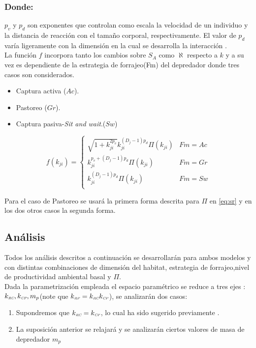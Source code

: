 \subsubsection*{Donde:}
$p_v$ y $p_d$ son exponentes que controlan como escala la velocidad de un individuo  y la distancia de reacci\'on con el tama\~no corporal, respectivamente. El valor de $p_d$ var\'ia ligeramente con la dimensi\'on en la cual se desarrolla la interacci\'on \citep{pawar2012dimensionality}.\\
La funci\'on $f$ incorpora tanto los cambios sobre $S_A$ como $\aleph$ respecto a $k$ y a su vez es dependiente de la estrategia de forrajeo(Fm) del depredador donde tres casos son considerados\citep{pawar2012dimensionality}.
\begin{itemize}
\item Captura activa ($Ac$).
\item Pastoreo ($Gr$).
\item Captura pasiva-\textit{Sit and wait}.($Sw$) 
\end{itemize}

\begin{equation}\label{eq:fkr}
f(k_{ji}) = 
\begin{cases}
\sqrt{1+k_{ji}^{2p_v}}k_{ji}^{(D_j-1)p_d} \Pi(k_{ji}) & Fm = Ac\\
k_{ji}^{p_v+(D_j-1)p_d}\Pi(k_{ji}) & Fm =Gr\\
k_{ji}^{(D_j-1)p_d}\Pi(k_{ji}) & Fm = Sw\\
\end{cases}
\end{equation}

Para el caso de Pastoreo se usar\'a la primera forma descrita para $\Pi$ en \eqref{eq:sr} y en los dos otros casos la segunda forma.

\subsection{An\'alisis}
Todos los an\'alisis descritos a continuaci\'on se desarrollar\'an para ambos modelos y con distintas combinaciones de dimensi\'on del habitat, estrategia de forrajeo,nivel de productividad ambiental basal y $\Pi$.\\
Dada la parametrizaci\'on empleada el espacio param\'etrico se reduce a tres ejes : $k_{\textit{\tiny RC}},k_{\textit{\tiny CP}}, m_p$(note que $k_{\textit{\tiny RP}} = k_{\textit{\tiny RC}} k_{\textit{\tiny CP}}$), se analizar\'an dos casos:
\begin{enumerate}
\item Supondremos que $k_{\textit{\tiny RC}} = k_{\textit{\tiny CP}}$, lo cual ha sido sugerido previamente \citep{peters1986ecological,brown2004toward}.\label{equalsizeratios}
\item La suposici\'on anterior se relajar\'a y se analizar\'an ciertos valores de masa de depredador $m_p$
\end{enumerate}

